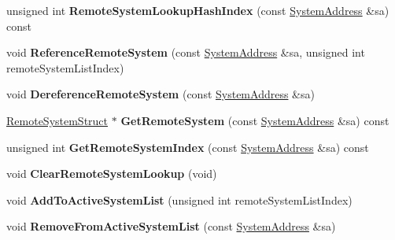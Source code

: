 \begin{DoxyCompactItemize}
\item 
\hypertarget{class_rak_net_1_1_rak_peer_aa0887eb70afec7d7cf664983f1c6746f}{unsigned int {\bfseries Remote\-System\-Lookup\-Hash\-Index} (const \hyperlink{struct_rak_net_1_1_system_address}{System\-Address} \&sa) const }\label{class_rak_net_1_1_rak_peer_aa0887eb70afec7d7cf664983f1c6746f}

\item 
\hypertarget{class_rak_net_1_1_rak_peer_a904e4ec6c93317ce92e6d8c76cc34439}{void {\bfseries Reference\-Remote\-System} (const \hyperlink{struct_rak_net_1_1_system_address}{System\-Address} \&sa, unsigned int remote\-System\-List\-Index)}\label{class_rak_net_1_1_rak_peer_a904e4ec6c93317ce92e6d8c76cc34439}

\item 
\hypertarget{class_rak_net_1_1_rak_peer_ad47a83d15fd7e300c4371e36775808fb}{void {\bfseries Dereference\-Remote\-System} (const \hyperlink{struct_rak_net_1_1_system_address}{System\-Address} \&sa)}\label{class_rak_net_1_1_rak_peer_ad47a83d15fd7e300c4371e36775808fb}

\item 
\hypertarget{class_rak_net_1_1_rak_peer_aea2e941d9f0cf272f8d3327f142f1283}{\hyperlink{struct_rak_net_1_1_rak_peer_1_1_remote_system_struct}{Remote\-System\-Struct} $\ast$ {\bfseries Get\-Remote\-System} (const \hyperlink{struct_rak_net_1_1_system_address}{System\-Address} \&sa) const }\label{class_rak_net_1_1_rak_peer_aea2e941d9f0cf272f8d3327f142f1283}

\item 
\hypertarget{class_rak_net_1_1_rak_peer_adcbcf61fe2995c04db2bc69c6b0aa2eb}{unsigned int {\bfseries Get\-Remote\-System\-Index} (const \hyperlink{struct_rak_net_1_1_system_address}{System\-Address} \&sa) const }\label{class_rak_net_1_1_rak_peer_adcbcf61fe2995c04db2bc69c6b0aa2eb}

\item 
\hypertarget{class_rak_net_1_1_rak_peer_a9fcc6ec837255a9e336c01858f607273}{void {\bfseries Clear\-Remote\-System\-Lookup} (void)}\label{class_rak_net_1_1_rak_peer_a9fcc6ec837255a9e336c01858f607273}

\item 
\hypertarget{class_rak_net_1_1_rak_peer_aad0d761b16712cfcc311652b2a7cc49c}{void {\bfseries Add\-To\-Active\-System\-List} (unsigned int remote\-System\-List\-Index)}\label{class_rak_net_1_1_rak_peer_aad0d761b16712cfcc311652b2a7cc49c}

\item 
\hypertarget{class_rak_net_1_1_rak_peer_a93a8f25798bee67db4c111888418a97b}{void {\bfseries Remove\-From\-Active\-System\-List} (const \hyperlink{struct_rak_net_1_1_system_address}{System\-Address} \&sa)}\label{class_rak_net_1_1_rak_peer_a93a8f25798bee67db4c111888418a97b}


\end{DoxyCompactItemize}
